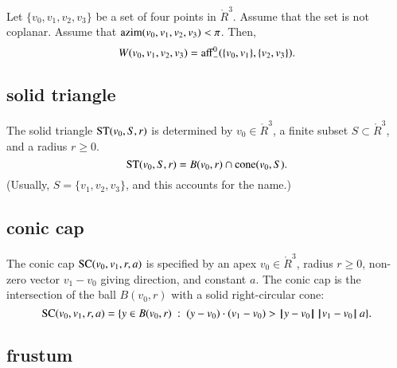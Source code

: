\begin{lemma} Let $\{v_0,v_1,v_2,v_3\}$ be a set of four points
in $\ring{R}^3$.  Assume that the set is not coplanar.
Assume that ${\operatorname{azim}}(v_0,v_1,v_2,v_3)<\pi$.
Then,
   $$W(v_0,v_1,v_2,v_3) = {\operatorname{aff}}^0_-(\{v_0,v_1\},\{v_2,v_3\}).$$
\end{lemma}


\subsection{solid triangle}

\begin{definition} The solid triangle ${\operatorname{ST}}(v_0,S,r)$ is
determined by  $v_0\in\ring{R}^3$, a finite subset $S\subset\ring{R}^3$,
and a radius $r\ge0$. 
    $$
    {\operatorname{ST}}(v_0,S,r) = 
    B(v_0,r)\cap {\operatorname{cone}}(v_0,S).
    $$
(Usually, $S=\{v_1,v_2,v_3\}$, and this accounts for
the name.)
\end{definition}



\subsection{conic cap}


\begin{definition}
The conic cap ${\operatorname{SC}}(v_0,v_1,r,a)$ is specified by an apex
$v_0\in\ring{R}^3$,  radius $r\ge0$,  non-zero vector $v_1-v_0$ giving
direction, and constant $a$.  The conic cap is the intersection of
the ball $B(v_0,r)$ with a solid right-circular cone:
    $$
    {\operatorname{SC}}(v_0,v_1,r,a)=\{y \in B(v_0,r) \ :\  (y-v_0)\cdot (v_1-v_0) > {\hskip0.1em|\hskip-0.15em|\hskip0.1em}y - v_0{\hskip0.1em|\hskip-0.15em|\hskip0.1em}\, {\hskip0.1em|\hskip-0.15em|\hskip0.1em}v_1 - v_0{\hskip0.1em|\hskip-0.15em|\hskip0.1em}\, a\}.
    $$
\end{definition}

\subsection{frustum}

